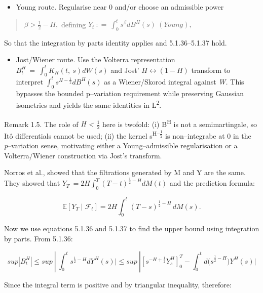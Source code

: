 \documentclass[12pt,a4paper]{report}
\numberwithin{equation}{section}
\begin{document}
\begin{itemize}
\item
  Young route. Regularise near 0 and/or choose an admissible power
\end{itemize}

\begin{quote}
\(\beta > \frac{1}{2} - H,\) defining
\(Y_{t}\ : = \ \int_{0}^{t}{s^{\beta}{dB}^{H}(s)}\ (Young),\)
\end{quote}

So that the integration by parts identity applies and 5.1.36--5.1.37
hold.

\begin{itemize}
\item
  Jost/Wiener route. Use the Volterra representation
  \(B_{t}^{H}\  = \ \int_{0}^{t}{K_{H}(t,\ s)dW(s)}\) and Jost'
  \(H \leftrightarrow (1 - H)\) transform to interpret
  \(\int_{0}^{t}{s^{H - \frac{1}{2}}{dB}^{H}(s)}\) as a Wiener/Skorod
  integral against \emph{W.} This bypasses the bounded p--variation
  requirement while preserving Gaussian isometries and yields the same
  identities in L\textsuperscript{2}.
\end{itemize}

Remark 1.5. The role of \emph{H \textless{} $\frac{1}{2}$} here is twofold: (i)
B\textsuperscript{H} is not a semimartingale, so Itô differentials
cannot be used; (ii) the kernel s\textsuperscript{H--$\frac{1}{2}$} is non--integrabe
at 0 in the \emph{p}--variation sense, motivating either a
Young--admissible regularisation or a Volterra/Wiener construction via
Jost's transform.

Norros et al., \cite{norros1999elementary_112} showed that the filtrations generated by M and
Y are the same. They showed that
\(Y_{T}\  = 2H\int_{0}^{T}{{(T - t)}^{\frac{1}{2} - H}dM(t)}\) and the
prediction formula:

\begin{equation}\tag{5.1.37}\label{eq:5.1.37}
\mathbb{E}\!\left[Y_T \mid \mathcal{F}_t\right]
= 2H\int_{0}^{t} (T-s)^{\frac{1}{2}-H}\,dM(s).
\end{equation}


Now we use equations 5.1.36 and 5.1.37 to find the upper bound using
integration by parts. From 5.1.36:

\[sup|B_{t}^{H}| \leq sup\ |\ \int_{0}^{t}{s^{\frac{1}{2} - H}dY^{H}(s)| \leq}sup\ |\left\lbrack s^{- H + \frac{1}{2}}Y_{s}^{H} \right\rbrack_{0}^{T} - \int_{0}^{t}{{d(s}^{\frac{1}{2} - H})Y^{H}(s)|}\]

Since the integral term is positive and by triangular inequality,
therefore:
\end{document}
